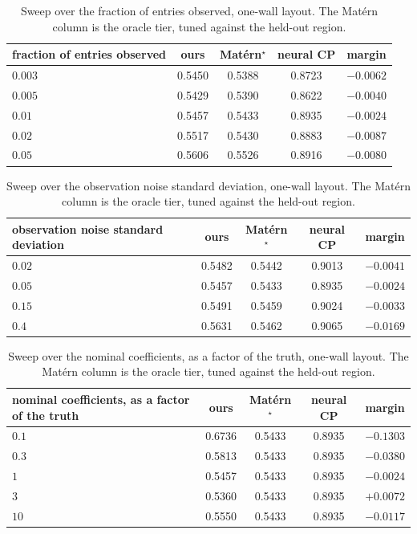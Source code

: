 \begin{table}[h]
  \centering
  \caption{Sweep over the fraction of entries observed, one-wall layout.  The Mat\'ern column is the oracle tier, tuned against the held-out region.}
  \label{tab:sweep-ratio}
  \small
  \begin{tabular}{lcccc}
    \toprule
    fraction of entries observed & ours & Mat\'ern$^\star$ & neural CP & margin \\
    \midrule
    $0.003$ & 0.5450 & 0.5388 & 0.8723 & $-0.0062$ \\
    $0.005$ & 0.5429 & 0.5390 & 0.8622 & $-0.0040$ \\
    $0.01$ & 0.5457 & 0.5433 & 0.8935 & $-0.0024$ \\
    $0.02$ & 0.5517 & 0.5430 & 0.8883 & $-0.0087$ \\
    $0.05$ & 0.5606 & 0.5526 & 0.8916 & $-0.0080$ \\
    \bottomrule
  \end{tabular}
\end{table}

\begin{table}[h]
  \centering
  \caption{Sweep over the observation noise standard deviation, one-wall layout.  The Mat\'ern column is the oracle tier, tuned against the held-out region.}
  \label{tab:sweep-noise}
  \small
  \begin{tabular}{lcccc}
    \toprule
    observation noise standard deviation & ours & Mat\'ern$^\star$ & neural CP & margin \\
    \midrule
    $0.02$ & 0.5482 & 0.5442 & 0.9013 & $-0.0041$ \\
    $0.05$ & 0.5457 & 0.5433 & 0.8935 & $-0.0024$ \\
    $0.15$ & 0.5491 & 0.5459 & 0.9024 & $-0.0033$ \\
    $0.4$ & 0.5631 & 0.5462 & 0.9065 & $-0.0169$ \\
    \bottomrule
  \end{tabular}
\end{table}

\begin{table}[h]
  \centering
  \caption{Sweep over the nominal coefficients, as a factor of the truth, one-wall layout.  The Mat\'ern column is the oracle tier, tuned against the held-out region.}
  \label{tab:sweep-coefficient}
  \small
  \begin{tabular}{lcccc}
    \toprule
    nominal coefficients, as a factor of the truth & ours & Mat\'ern$^\star$ & neural CP & margin \\
    \midrule
    $0.1$ & 0.6736 & 0.5433 & 0.8935 & $-0.1303$ \\
    $0.3$ & 0.5813 & 0.5433 & 0.8935 & $-0.0380$ \\
    $1$ & 0.5457 & 0.5433 & 0.8935 & $-0.0024$ \\
    $3$ & 0.5360 & 0.5433 & 0.8935 & $+0.0072$ \\
    $10$ & 0.5550 & 0.5433 & 0.8935 & $-0.0117$ \\
    \bottomrule
  \end{tabular}
\end{table}

